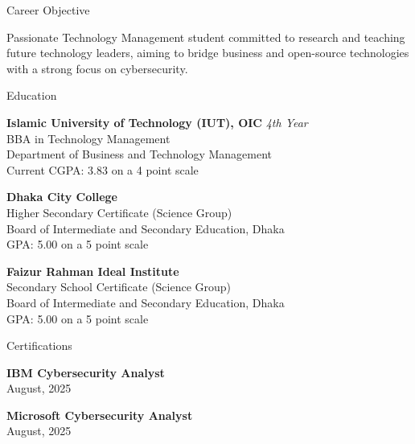 \documentclass[
	a4paper,
	12pt,
]{resume}
\begin{document}
\begin{rSection}{Career Objective}

	Passionate Technology Management student committed to research and teaching future technology leaders, aiming to bridge business and open-source technologies with a strong focus on cybersecurity.

\end{rSection}


\begin{rSection}{Education}

	\textbf{Islamic University of Technology (IUT), OIC} \hfill \textit{4th Year} \\
	BBA in Technology Management \\
	Department of Business and Technology Management \\
	Current CGPA: 3.83 on a 4 point scale

	\textbf{Dhaka City College} \hfill \textit{} \\
	Higher Secondary Certificate (Science Group) \\
	Board of Intermediate and Secondary Education, Dhaka \\
	GPA: 5.00 on a 5 point scale

	\textbf{Faizur Rahman Ideal Institute} \hfill \textit{} \\
	Secondary School Certificate (Science Group) \\
	Board of Intermediate and Secondary Education, Dhaka \\
	GPA: 5.00 on a 5 point scale

\end{rSection}

\begin{rSection}{Certifications}

	\textbf{IBM Cybersecurity Analyst} \hfill \textit{} \\
	August, 2025

	\textbf{Microsoft Cybersecurity Analyst} \hfill \textit{} \\
	August, 2025

\end{rSection}
\end{document}
